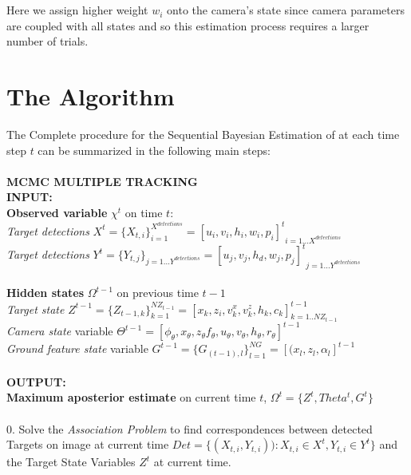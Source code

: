 \\
\\
Here we assign higher weight $w_i$ onto the camera’s state since camera parameters are coupled with all states and so this estimation process requires a larger number of trials. 

\newpage
\section{The Algorithm}
The Complete procedure for the Sequential Bayesian Estimation of
 at each time step $t$ can be summarized in the following  main steps:
\\
\\
{\bf MCMC MULTIPLE TRACKING }\\[.4cm]
{\sf
\textbf{INPUT:}\\
[.2cm] \textbf{ Observed variable} $\chi^t$ on time $t$:\\
[.5cm] \textit{Target detections} $X^t=\{X_{t,i}\}_{i=1}^{X^{detections}}={[u_i,v_i,h_i,w_i,p_i]^t}_{i=1...X^{ detections}}$ \\
[.5cm] \textit{Target detections} $Y^t =\{Y_{t,j}\}_{j=1...Y^{ detections}}={[u_j,v_j,h_d,w_j,p_j]^t}_{j=1...Y^{detections}}$
\\
\\
[.2cm] \textbf{ Hidden states} $\Omega^{t-1}$ on previous time $t-1$\\
[.5cm] \textit{Target state} $Z^{t-1} = \{Z_{{t-1},k} \}_{k=1}^{NZ_{t-1}}=[ x_k,z_i,v_k^x,v_k^z,h_k,c_k]_{k=1..NZ_{t-1}}^{t-1}$\\
[.5cm] \textit{Camera state} variable $\Theta^{t-1}=[\phi_{\theta}, x_{\theta}, z_{\theta} f_{\theta}, u_{\theta}, v_{\theta}, h_{\theta},r_{\theta}]^{t-1}$\\
[.5cm] \textit{Ground feature state} variable $G^{t-1} =\{G_{(t-1),l} \}_{l=1}^{NG}=[(x_l,z_l,\alpha_l]^{t-1}$
\\
\\
\textbf{OUTPUT:}\\ 
[.2cm] \textbf{ Maximum aposterior estimate} on current time $t$, $\Omega^{t}=\{Z^{t},Theta^{t},G^{t}\}$\\
\\
0. Solve the \textit{Association Problem} to find correspondences between detected Targets on image at current time $Det=\{(X_{t,i}, Y_{t,i})):X_{t,i} \in X^t,Y_{t,i} \in Y^t\}$ and the Target State Variables $Z^{t}$ at current time.\\
}
